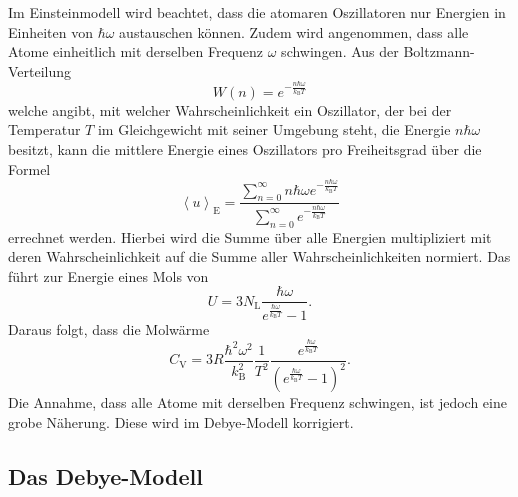 Im Einsteinmodell wird beachtet, dass die atomaren Oszillatoren nur Energien in Einheiten von $\hbar\omega$ austauschen können.
Zudem wird angenommen, dass alle Atome einheitlich mit derselben Frequenz $\omega$ schwingen.
Aus der Boltzmann-Verteilung
\begin{equation}
  W(n) = e^{-\frac{n\hbar\omega}{k_{\text{B}}T}}
\end{equation}
welche angibt, mit welcher Wahrscheinlichkeit ein Oszillator, der bei der Temperatur $T$ im Gleichgewicht mit seiner Umgebung steht, die Energie $n\hbar\omega$ besitzt, kann die mittlere Energie eines Oszillators pro Freiheitsgrad über die Formel
\begin{equation}
  \left\langle u \right\rangle_{\text{E}} = \frac{\sum_{n=0}^{\infty}n\hbar\omega e^{-\frac{n\hbar\omega}{k_{\text{B}}T}}}{\sum_{n=0}^{\infty} e^{-\frac{n\hbar\omega}{k_{\text{B}}T}}}
\end{equation}
errechnet werden.
Hierbei wird die Summe über alle Energien multipliziert mit deren Wahrscheinlichkeit auf die Summe aller Wahrscheinlichkeiten normiert.
Das führt zur Energie eines Mols von
\begin{equation}
  U = 3N_{\text{L}}\frac{\hbar\omega}{e^{\frac{\hbar\omega}{k_{\text{B}}T}}-1}.
\end{equation}
Daraus folgt, dass die Molwärme
\begin{equation}
  C_{\text{V}} = 3R\frac{\hbar^2\omega^2}{k_{\text{B}}^2}\frac{1}{T^2}\frac{e^{\frac{\hbar\omega}{k_{\text{B}}T}}}{\left(e^{\frac{\hbar\omega}{k_{\text{B}}T}}-1\right)^2}.
\end{equation}
Die Annahme, dass alle Atome mit derselben Frequenz schwingen, ist jedoch eine grobe Näherung. Diese wird im Debye-Modell korrigiert.

\subsection{Das Debye-Modell}

